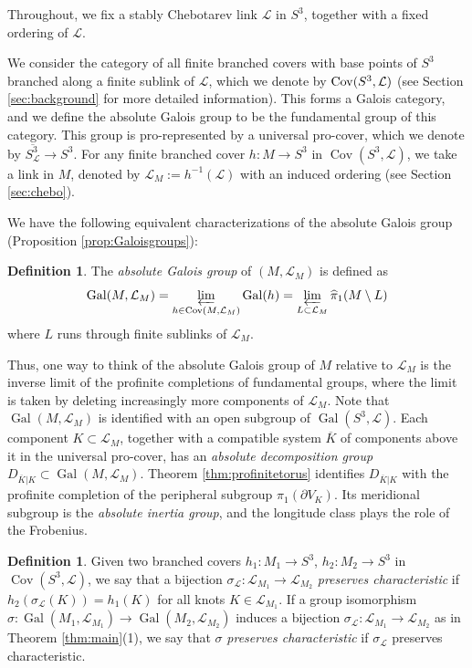 \documentclass{amsart}
\theoremstyle{plain}
\theoremstyle{definition}
\newtheorem{Def}[theorem]{Definition}
\theoremstyle{plain}
\theoremstyle{plain}
\theoremstyle{plain}
\theoremstyle{remark}
\theoremstyle{remark}
\theoremstyle{plain}
\theoremstyle{definition}
\theoremstyle{plain}
\DeclareMathOperator{\Gal}{\mathrm{Gal}}
\DeclareMathOperator{\Cov}{\mathrm{Cov}}
\newcounter{main}
\theoremstyle{plain}
\theoremstyle{plain}
\numberwithin{equation}{section}
\begin{document}
Throughout, we fix a stably Chebotarev link $\mathcal{L}$ in $S^3$, together with a fixed ordering of $\mathcal{L}$.

\medskip

We consider the category of all finite branched covers with base points of $S^3$ branched along a finite sublink of $\mathcal{L}$, which we denote by ${\rm Cov}(S^3,\mathcal{L})$ (see Section \ref{sec:background} for more detailed information). This forms a Galois category, and we define the absolute Galois group to be the fundamental group of this category. This group is pro-represented by a universal pro-cover, which we denote by $\overline{S^3_\mathcal{L}}\to S^3$. For any finite branched cover $h:M\rightarrow S^3$ in $\Cov(S^3, \mathcal{L})$, we take a link in $M$, denoted by $\mathcal{L}_M:=h^{-1}(\mathcal{L})$ with an induced ordering (see Section \ref{sec:chebo}).

\medskip

We have the following equivalent characterizations of the absolute Galois group (Proposition \ref{prop:Galoisgroups}):

\begin{Def}\label{def:galois}
The \emph{absolute Galois group} of $(M, \mathcal{L}_M)$ is defined as 
\begin{equation}
    \Gal(M, \mathcal{L}_M) = \varprojlim_{h \in \Cov(M, \mathcal{L}_M)}\Gal(h)= \varprojlim_{L\subset \mathcal{L}_M} \widehat{\pi}_1(M\setminus L)
\end{equation}
where $L$ runs through finite sublinks of $\mathcal{L}_M$.
\end{Def}

Thus, one way to think of the absolute Galois group of $M$ relative to $\mathcal{L}_M$ is the inverse limit of the profinite completions of fundamental groups, where the limit is taken by deleting increasingly more components of $\mathcal{L}_M$. Note that $\Gal(M, \mathcal L_M)$ is identified with an open subgroup of $\Gal(S^3, \mathcal L)$. Each component $K \subset \mathcal L_M$, together with a compatible system $\overline K$ of components above it in the universal pro-cover, has an \emph{absolute decomposition group} $D_{\overline K|K} \subset \Gal(M, \mathcal L_M)$. Theorem \ref{thm:profinitetorus} identifies $D_{\overline K|K}$ with the profinite completion of the peripheral subgroup $\pi_1(\partial V_K)$. Its meridional subgroup is the \emph{absolute inertia group}, and the longitude class plays the role of the Frobenius.

\begin{Def}\label{def:charpres}
Given two branched covers $h_1:M_1\rightarrow S^3$, $h_2:M_2\rightarrow S^3$ in $\Cov(S^3, \mathcal{L})$, we say that a bijection $\sigma_\mathcal{L}:\mathcal{L}_{M_1}\rightarrow\mathcal{L}_{M_2}$  \emph{preserves characteristic} if $h_2(\sigma_\mathcal{L}(K))=h_1(K)$ for all knots $K\in\mathcal{L}_{M_1}$. If a group isomorphism $\sigma: \Gal(M_1, \mathcal{L}_{M_1}) \to \Gal(M_2, \mathcal{L}_{M_2})$ induces a bijection $\sigma_\mathcal{L}: \mathcal{L}_{M_1} \to \mathcal{L}_{M_2}$ as in Theorem \ref{thm:main}(1), we say that $\sigma$ \emph{preserves characteristic} if $\sigma_\mathcal{L}$  preserves characteristic. 
\end{Def}
\end{document}
